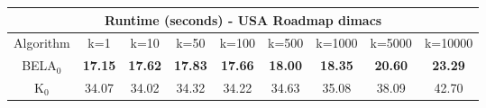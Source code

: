 \begin{tabular}{c|cccccccc}\toprule
\multicolumn{9}{c}{Runtime (seconds) - USA Roadmap dimacs}\\ \midrule
Algorithm & k=1 & k=10 & k=50 & k=100 & k=500 & k=1000 & k=5000 & k=10000 \\ \midrule
BELA$_0$ & \textbf{17.15} & \textbf{17.62} & \textbf{17.83} & \textbf{17.66} & \textbf{18.00} & \textbf{18.35} & \textbf{20.60} & \textbf{23.29} \\
K$_0$ & 34.07 & 34.02 & 34.32 & 34.22 & 34.63 & 35.08 & 38.09 & 42.70 \\ \bottomrule 
\end{tabular}
